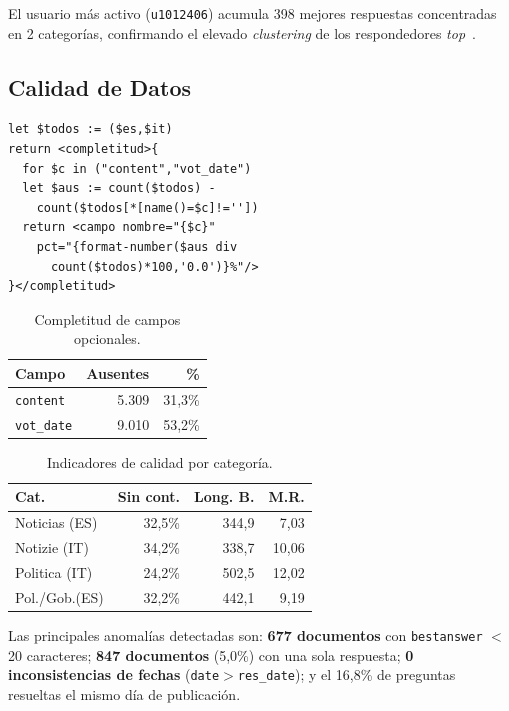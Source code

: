 \documentclass[10pt,twocolumn,a4paper]{article}
\begin{document}
El usuario m\'as activo (\texttt{u1012406}) acumula 398 mejores
respuestas concentradas en 2 categor\'ias, confirmando el elevado
\textit{clustering} de los respondedores \textit{top}~\cite{shen2015}.

\subsection{Calidad de Datos}

\begin{lstlisting}[language=XQuery,caption={Analisis de completitud.}, xleftmargin=0.5cm]
let $todos := ($es,$it)
return <completitud>{
  for $c in ("content","vot_date")
  let $aus := count($todos) -
    count($todos[*[name()=$c]!=''])
  return <campo nombre="{$c}"
    pct="{format-number($aus div
      count($todos)*100,'0.0')}%"/>
}</completitud>
\end{lstlisting}

\begin{table}[H]
\centering
\caption{Completitud de campos opcionales.}
\label{tab:completitud}
\begin{tabular}{lrr}
\toprule
\textbf{Campo} & \textbf{Ausentes} & \textbf{\%} \\
\midrule
\texttt{content}   & 5.309 & 31,3\% \\
\texttt{vot\_date} & 9.010 & 53,2\% \\
\bottomrule
\end{tabular}
\end{table}

\begin{table}[H]
\centering
\caption{Indicadores de calidad por categor\'ia.}
\label{tab:calidad_cat}
\begin{tabular}{p{1.9cm}rrr}
\toprule
\textbf{Cat.} & \textbf{Sin cont.} & \textbf{Long. B.} & \textbf{M.R.} \\
\midrule
Noticias (ES) & 32,5\% & 344,9 & 7,03 \\
Notizie  (IT) & 34,2\% & 338,7 & 10,06 \\
Politica (IT) & 24,2\% & 502,5 & 12,02 \\
Pol./Gob.(ES) & 32,2\% & 442,1 &  9,19 \\
\bottomrule
\end{tabular}
\end{table}

Las principales anomal\'ias detectadas son: \textbf{677 documentos}
con \texttt{bestanswer} $<$20 caracteres; \textbf{847 documentos}
(5,0\%) con una sola respuesta; \textbf{0 inconsistencias de fechas}
(\texttt{date}$>$\texttt{res\_date}); y el 16,8\% de preguntas
resueltas el mismo d\'ia de publicaci\'on.
\end{document}
